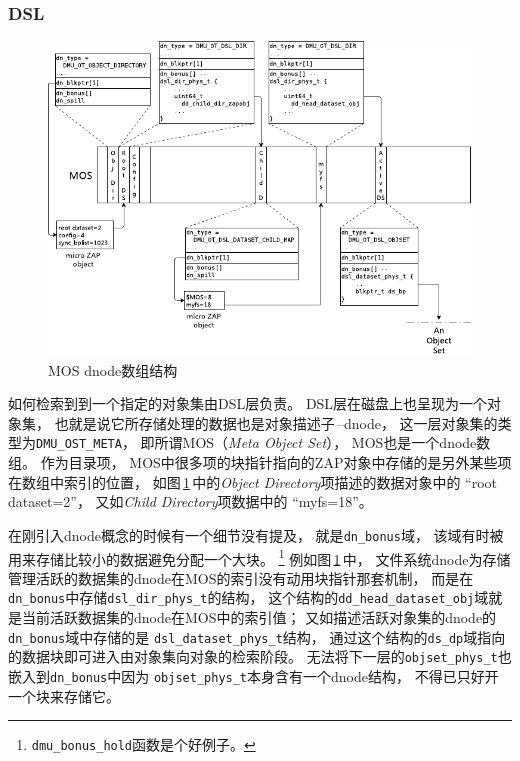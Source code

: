 \subsubsection{DSL}

\begin{figure}[!ht]
  \centering
  \includegraphics[width=.95\textwidth]{fig/zfs_dsl.pdf}
  \caption{MOS dnode数组结构}\label{fig:mos}
\end{figure}

如何检索到到一个指定的对象集由DSL层负责。
DSL层在磁盘上也呈现为一个对象集，
也就是说它所存储处理的数据也是对象描述子\,--dnode，
这一层对象集的类型为\verb|DMU_OST_META|，
即所谓MOS（{\em Meta Object Set}），
MOS也是一个dnode数组。
作为目录项，
MOS中很多项的块指针指向的ZAP对象中存储的是另外某些项在数组中索引的位置，
如图\,\ref{fig:mos}\,中的{\em Object Directory}项描述的数据对象中的%
``root dataset=2''，
又如{\em Child Directory}项数据中的%
``myfs=18''。

在刚引入dnode概念的时候有一个细节没有提及，
就是\verb|dn_bonus|域，
该域有时被用来存储比较小的数据避免分配一个大块。
\footnote{{\tt dmu\_bonus\_hold}函数是个好例子。}
例如图\,\ref{fig:mos}\,中，
文件系统dnode为存储管理活跃的数据集的dnode在MOS的索引没有动用块指针那套机制，
而是在\verb|dn_bonus|中存储\verb|dsl_dir_phys_t|的结构，
这个结构的\verb|dd_head_dataset_obj|域就是当前活跃数据集的dnode在MOS中的索引值；
又如描述活跃对象集的dnode的\verb|dn_bonus|域中存储的是%
\verb|dsl_dataset_phys_t|结构，
通过这个结构的\verb|ds_dp|域指向的数据块即可进入由对象集向对象的检索阶段。
无法将下一层的\verb|objset_phys_t|也嵌入到\verb|dn_bonus|中因为%
\verb|objset_phys_t|本身含有一个dnode结构，
不得已只好开一个块来存储它。

